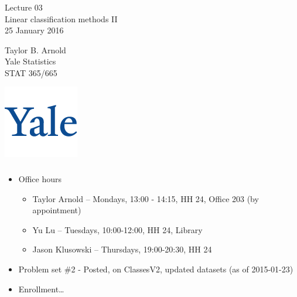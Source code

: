 \documentclass[xetex,mathserif,serif,aspectratio=169]{beamer}
\begin{document}
\begin{frame}[fragile] \frametitle{} \oldB \small

\vfill

{\fontsize{0.7cm}{0cm}\selectfont Lecture 03 \\\vspace{0.2cm} Linear classification methods II}\\\vspace{0.5cm}
25 January 2016

\vspace{2cm}

\begin{minipage}{0.6\textwidth}
Taylor B. Arnold \\
Yale Statistics \\
STAT 365/665
\end{minipage}
\hfill
\begin{minipage}{0.3\textwidth}\raggedleft
\includegraphics[scale=0.3]{../yale-logo.png}
\end{minipage}%

\end{frame}

\begin{frame}[fragile] \frametitle{} \oldB \small

\begin{itemize}
\item Office hours
\begin{itemize}
\item Taylor Arnold -- Mondays, 13:00 - 14:15, HH 24, Office 203 (by appointment)
\item Yu Lu -- Tuesdays, 10:00-12:00, HH 24, Library
\item Jason Klusowski -- Thursdays, 19:00-20:30, HH 24
\end{itemize}
\item Problem set \#2 - Posted, on ClassesV2, updated datasets (as of 2015-01-23)
\item Enrollment\ldots
\end{itemize}

\end{frame}
\end{document}

